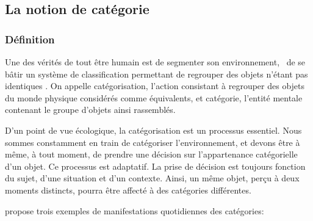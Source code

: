 \subsection{La notion de catégorie}

\subsubsection{Définition}

Une des vérités de tout être humain est de segmenter son environnement, \ie~de se bâtir un système de classification permettant de regrouper des objets n'étant pas identiques \citep[p. 1]{rosch1978cognition}. On appelle catégorisation, l'action consistant à regrouper des objets du monde physique considérés comme équivalents, et catégorie, l'entité mentale contenant le groupe d'objets ainsi rassemblés. 
 
D'un point de vue écologique, la catégorisation est un processus essentiel. Nous sommes constamment en train de catégoriser l'environnement, et devons être à même, à tout moment, de prendre une décision sur l'appartenance catégorielle d'un objet. Ce processus est adaptatif. La prise de décision est toujours fonction du sujet, d'une situation et d'un contexte. Ainsi, un même objet, perçu à deux moments distincts, pourra être affecté à des catégories différentes. 


\citep{anderson1991adaptive} propose trois exemples de manifestations quotidiennes des catégories:

